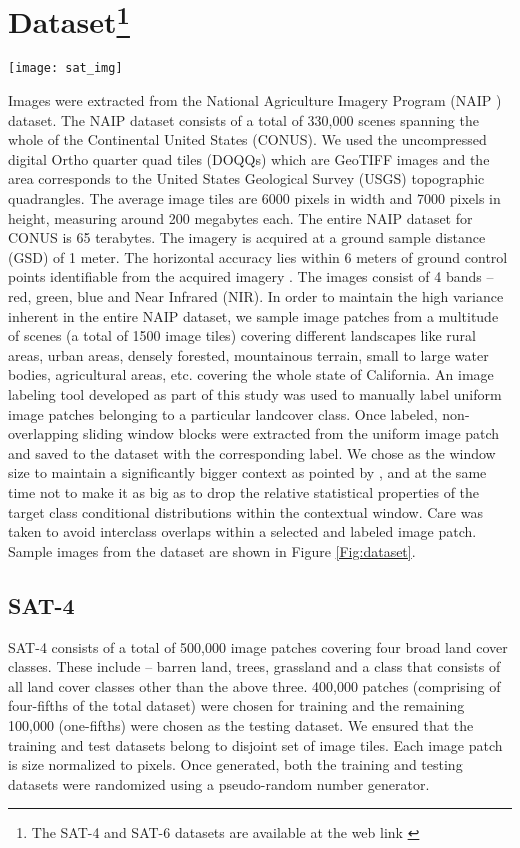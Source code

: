 \documentclass[11pt,a4paper]{article}
\begin{document}
\section[Dataset]{Dataset\footnote{The SAT-4 and SAT-6 datasets are available at the web link \cite{datasets}}}
\begin{figure*}
  \centering
    \texttt{[image: sat\_img]}
  \caption{Sample images from the SAT-6 dataset} \label{Fig:dataset}
\end{figure*}
Images were extracted from the National Agriculture Imagery Program (NAIP \cite{naip}) dataset. The NAIP dataset consists of a total of 330,000 scenes spanning the whole of the Continental United States (CONUS). We used the uncompressed digital Ortho quarter quad tiles (DOQQs) which are GeoTIFF images and the area corresponds to the United States Geological Survey (USGS) topographic quadrangles. The average image tiles are 6000 pixels in width and 7000 pixels in height, measuring around 200 megabytes each. The entire NAIP dataset for CONUS is 65 terabytes. The imagery is acquired at a ground sample distance (GSD) of 1 meter. The horizontal accuracy lies within 6 meters of ground control points identifiable from the acquired imagery \cite{modis}. The images consist of 4 bands -- red, green, blue and Near Infrared (NIR). In order to maintain the high variance inherent in the entire NAIP dataset, we sample image patches from a multitude of scenes (a total of 1500 image tiles) covering different landscapes like rural areas, urban areas, densely forested, mountainous terrain, small to large water bodies, agricultural areas, etc. covering the whole state of California. An image labeling tool developed as part of this study was used to manually label uniform image patches belonging to a particular landcover class. Once labeled,  non-overlapping sliding window blocks were extracted from the uniform image patch and saved to the dataset with the corresponding label. We chose  as the window size to maintain a significantly bigger context as pointed by \cite{MnihHinton2010}, and at the same time not to make it as big as to drop the relative statistical properties of the target class conditional distributions within the contextual window. Care was taken to avoid interclass overlaps within a selected and labeled image patch. Sample images from the dataset are shown in Figure \ref{Fig:dataset}.

\subsection{SAT-4}
SAT-4 consists of a total of 500,000 image patches covering four broad land cover classes. These include -- barren land, trees, grassland and a class that consists of all land cover classes other than the above three. 400,000 patches (comprising of four-fifths of the total dataset) were chosen for training and the remaining 100,000 (one-fifths) were chosen as the testing dataset. We ensured that the training and test datasets belong to disjoint set of image tiles. Each image patch is size normalized to  pixels. Once generated, both the training and testing datasets were randomized using a pseudo-random number generator.
\end{document}
